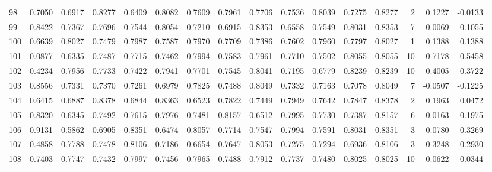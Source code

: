 \begin{tabular}{lrrrrrrrrrrrrrrr}
98  &      0.7050 &  0.6917 &  0.8277 &  0.6409 &  0.8082 &  0.7609 &  0.7961 &  0.7706 &  0.7536 &  0.8039 &   0.7275 &     0.8277 &      2 &                    0.1227 &                    -0.0133 \\
99  &      0.8422 &  0.7367 &  0.7696 &  0.7544 &  0.8054 &  0.7210 &  0.6915 &  0.8353 &  0.6558 &  0.7549 &   0.8031 &     0.8353 &      7 &                   -0.0069 &                    -0.1055 \\
100 &      0.6639 &  0.8027 &  0.7479 &  0.7987 &  0.7587 &  0.7970 &  0.7709 &  0.7386 &  0.7602 &  0.7960 &   0.7797 &     0.8027 &      1 &                    0.1388 &                     0.1388 \\
101 &      0.0877 &  0.6335 &  0.7487 &  0.7715 &  0.7462 &  0.7994 &  0.7583 &  0.7961 &  0.7710 &  0.7502 &   0.8055 &     0.8055 &     10 &                    0.7178 &                     0.5458 \\
102 &      0.4234 &  0.7956 &  0.7733 &  0.7422 &  0.7941 &  0.7701 &  0.7545 &  0.8041 &  0.7195 &  0.6779 &   0.8239 &     0.8239 &     10 &                    0.4005 &                     0.3722 \\
103 &      0.8556 &  0.7331 &  0.7370 &  0.7261 &  0.6979 &  0.7825 &  0.7488 &  0.8049 &  0.7332 &  0.7163 &   0.7078 &     0.8049 &      7 &                   -0.0507 &                    -0.1225 \\
104 &      0.6415 &  0.6887 &  0.8378 &  0.6844 &  0.8363 &  0.6523 &  0.7822 &  0.7449 &  0.7949 &  0.7642 &   0.7847 &     0.8378 &      2 &                    0.1963 &                     0.0472 \\
105 &      0.8320 &  0.6345 &  0.7492 &  0.7615 &  0.7976 &  0.7481 &  0.8157 &  0.6512 &  0.7995 &  0.7730 &   0.7387 &     0.8157 &      6 &                   -0.0163 &                    -0.1975 \\
106 &      0.9131 &  0.5862 &  0.6905 &  0.8351 &  0.6474 &  0.8057 &  0.7714 &  0.7547 &  0.7994 &  0.7591 &   0.8031 &     0.8351 &      3 &                   -0.0780 &                    -0.3269 \\
107 &      0.4858 &  0.7788 &  0.7478 &  0.8106 &  0.7186 &  0.6654 &  0.7647 &  0.8053 &  0.7275 &  0.7294 &   0.6936 &     0.8106 &      3 &                    0.3248 &                     0.2930 \\
108 &      0.7403 &  0.7747 &  0.7432 &  0.7997 &  0.7456 &  0.7965 &  0.7488 &  0.7912 &  0.7737 &  0.7480 &   0.8025 &     0.8025 &     10 &                    0.0622 &                     0.0344 \\

\end{tabular}
